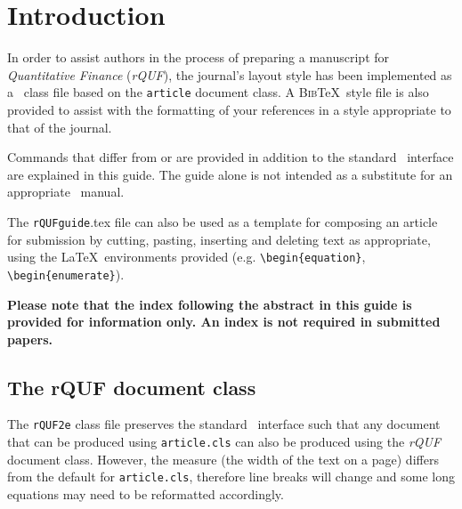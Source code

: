 \documentclass{rQUF2e}
\theoremstyle{plain}
\theoremstyle{definition}
\theoremstyle{remark}
\begin{document}
\section{Introduction}

In order to assist authors in the process of preparing a manuscript for \textit{Quantitative Finance} (\textit{rQUF}), the journal's layout style has been implemented as a \LaTeXe\ class file based on the \texttt{article} document class. A \textsc{Bib}\TeX\ style file is also provided to assist with the formatting of your references in a style appropriate to that of the journal.

Commands that differ from or are provided in addition to the standard \LaTeXe\ interface are explained in this guide. The guide alone is not intended as a substitute for an appropriate \LaTeXe\ manual.

The \verb"rQUFguide".tex file can also be used as a template for composing an article for submission by cutting, pasting, inserting and
deleting text as appropriate, using the \LaTeX\ environments provided (e.g. \verb"\begin{equation}", \verb"\begin{enumerate}").

\textbf{Please note that the index following the abstract in this guide is provided for information only. An index is not required in submitted papers.}


\subsection{The {\bi rQUF} document class}\label{class}

The \texttt{rQUF2e} class file preserves the standard \LaTeXe\ interface such that any document that can
be produced using {\tt article.cls} can also be produced using the {\it rQUF} document class.
However, the measure (the width of the text on a page) differs from the default for {\tt article.cls}, therefore line breaks
will change and some long equations may need to be reformatted accordingly.
\end{document}
